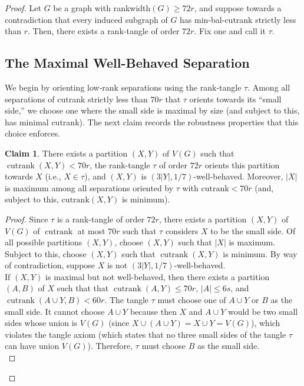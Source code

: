 \documentclass{article}
\theoremstyle{definition}
\newtheorem{claim}[theorem]{Claim}
\begin{document}
\begin{proof}


Let $G$ be a graph with rankwidth$(G)\geq 72r$, and suppose towards a contradiction that every induced subgraph of $G$ has min-bal-cutrank strictly less than $r$. Then, there exists a rank-tangle of order $72r$. Fix one and call it $\tau$.\\

\subsection{The Maximal Well-Behaved Separation}
We begin by orienting low‑rank separations using the rank‑tangle $\tau$. Among all separations of cutrank strictly less than $70r$ that $\tau$ orients towards its ``small side,'' we choose one where the small side is maximal by size (and subject to this, has minimal cutrank). The next claim records the robustness properties that this choice enforces.\\


\begin{claim}
\label{claim:rank-tangle existence}
    There exists a partition $(X,Y)$ of $V(G)$ such that $\operatorname{cutrank}(X,Y) < 70r$, the rank-tangle $\tau$ of order $72r$ orients this partition towards $X$ (i.e., $X \in \tau$), and $(X,Y)$ is $(3|Y|, 1/7)$-well-behaved. Moreover, $|X|$ is maximum among all separations oriented by $\tau$ with $\mathrm{cutrank}<70r$ (and, subject to this, $\mathrm{cutrank}(X,Y)$ is minimum).
\end{claim}

\begin{proof} 
Since $\tau$ is a rank-tangle of order $72r$, there exists a partition $(X,Y)$ of $V(G)$ of $\operatorname{cutrank}$ at most $70r$ such that $\tau$ considers $X$ to be the small side. Of all possible partitions $(X,Y)$, choose $(X,Y)$ such that $|X|$ is maximum. Subject to this, choose $(X, Y)$ such that $\operatorname{cutrank}$$(X, Y)$ is minimum. By way of contradiction, suppose $X$ is not $(3|Y|, 1/7)$-well-behaved. \\

If $(X,Y)$ is maximal but not well-behaved, then there exists a partition $(A,B)$ of $X$ such that that $\operatorname{cutrank}(A,Y)\leq 70r$, $|A| \leq 6s$, and $\operatorname{cutrank}(A \cup Y,B) < 60r$. The tangle $\tau$ must choose one of $A\cup Y$ or $B$ as the small side.  It cannot choose $A\cup Y$ because then $X$ and $A\cup Y$ would be two small sides whose union is $V(G)$ (since $X \cup (A\cup Y) = X\cup Y = V(G)$), which violates the tangle axiom (which states that no three small sides of the tangle $\tau$ can have union $V(G)$). Therefore, $\tau$ must choose $B$ as the small side.\\


\end{proof}
\end{proof}
\end{document}
